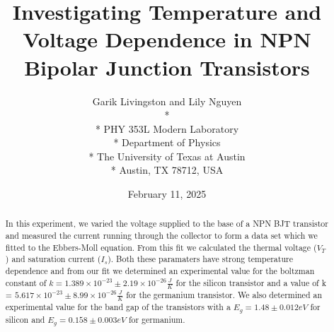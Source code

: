 \documentclass[12pt,letterpaper,twocolumn]{article}
\begin{document}

\title{Investigating Temperature and Voltage Dependence in NPN Bipolar Junction Transistors}

\author{
 Garik Livingston and Lily Nguyen \\*
  \\*
 PHY 353L Modern Laboratory \\*
 Department of Physics \\*
 The University of Texas at Austin \\*
 Austin, TX 78712, USA
}
\date{February 11, 2025}


\maketitle


\begin{abstract}
	In this experiment, we varied the voltage supplied to the base of a NPN BJT transistor and measured the current running through the collector to form a data set which we fitted to the Ebbers-Moll equation.
	From this fit we calculated the thermal voltage ($V_T$) and saturation current ($I_s$). Both these paramaters have strong temperature dependence and from our fit we determined an experimental value for the boltzman constant of $k = 1.389 \times 10^{-23} \pm 2.19 \times 10^{-26} \frac{J}{K}$ for the silicon transistor and a value of k = $5.617 \times 10^{-23}\pm 8.99 \times 10^{-26} \frac{J}{K}$ for the germanium transistor. 
	We also determined an experimental value for the band gap of the transistors with a $E_g = 1.48 \pm 0.012eV$ for silicon and  $E_g = 0.158 \pm 0.003 eV$ for germanium.
	
\end{abstract}

\end{document}
